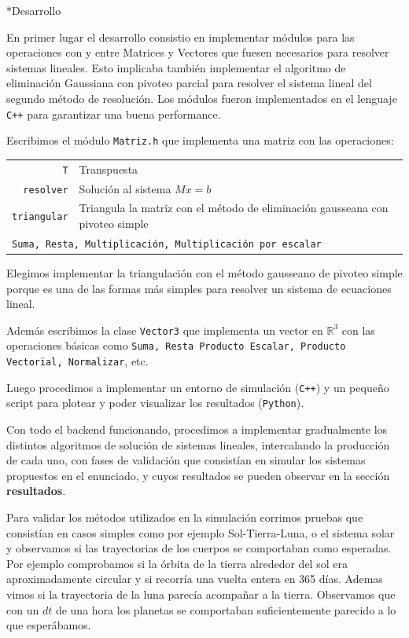 \documentclass[12pt,titlepage]{article}
\newenvironment{usection}[1]{\newpage\begin{section}*{#1}	\addcontentsline{toc}{section}{#1}}{\end{section}}
\begin{document}
	\begin{usection}{Desarrollo}

		En primer lugar el desarrollo consistio en implementar módulos
		para las operaciones con y entre Matrices y Vectores que
		fuesen necesarios para resolver sistemas lineales. Esto
		implicaba también implementar el algoritmo de eliminación
		Gaussiana con pivoteo parcial para resolver el sistema lineal
		del segundo método de resolución. Los módulos fueron
		implementados en el lenguaje \texttt{C++} para garantizar una
		buena performance.
		
		Escribimos el módulo \texttt{Matriz.h} que implementa una matriz
		con las operaciones:
		
		\begin{tabular}{rl}
			\texttt{T} & Transpuesta\\
			\texttt{resolver} & Solución al sistema $Mx=b$\\
			\texttt{triangular} & Triangula la matriz con el método de eliminación gausseana con pivoteo simple\\
			\multicolumn{2}{l}{
				\texttt{Suma, Resta, Multiplicación, Multiplicación por escalar}
			}
		\end{tabular}
		
		Elegimos implementar la triangulación con el método gausseano
		de pivoteo simple porque es una de las formas más simples para
		resolver un sistema de ecuaciones lineal.
		
		Además escribimos la clase \texttt{Vector3} que implementa un vector
		en $\mathbb{R}^3$ con las operaciones básicas como \texttt{Suma, Resta
		Producto Escalar, Producto Vectorial, Normalizar}, etc.

		Luego procedimos a implementar un entorno de simulación
		(\texttt{C++}) y un pequeño script para plotear y poder
		visualizar los resultados (\texttt{Python}). 

		Con todo el backend funcionando, procedimos a implementar
		gradualmente los distintos algoritmos de solución de sistemas
		lineales, intercalando la producción de cada uno, con fases de
		validación que consistían en simular los sistemas propuestos
		en el enunciado, y cuyos resultados se pueden observar en la
		sección \textbf{resultados}.
		
		Para validar los métodos utilizados en la simulación corrimos pruebas
		que consistían en casos simples como por ejemplo Sol-Tierra-Luna, o el
		sistema solar y observamos si las trayectorias de los cuerpos se comportaban
		como esperadas. Por ejemplo comprobamos si la órbita de la tierra alrededor del
		sol era aproximadamente circular y si recorría una vuelta entera en 365 días.
		Ademas vimos si la trayectoria de la luna parecía acompañar a la tierra.
		Observamos que con un $dt$ de una hora los planetas se comportaban suficientemente
		parecido a lo que esperábamos.


\end{usection}
\end{document}
